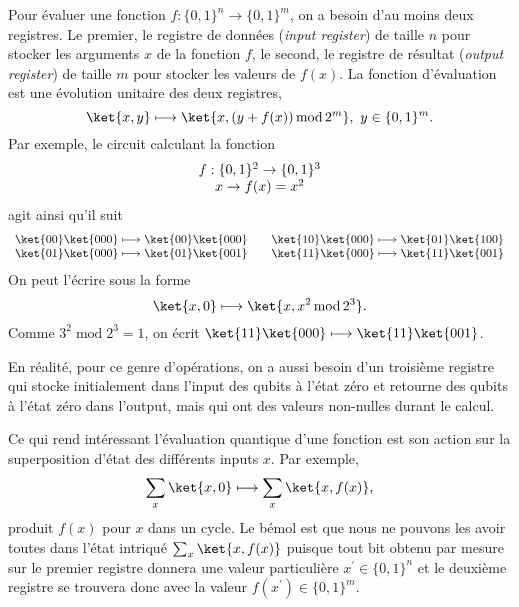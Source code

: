 Pour évaluer une fonction $f:\{0,1\}^n\rightarrow\{0,1\}^{m}$, on a besoin
d'au moins deux registres. Le premier, le registre de données (\emph{input
register}) de taille $n$ pour stocker les arguments $x$ de la fonction $f$, le
second, le registre de résultat (\emph{output register}) de taille $m$ pour
stocker les valeurs de $f(x)$. La fonction d'évaluation est une évolution
unitaire des deux registres,%
\begin{equation}
\ket{x,y} \longmapsto\ket{x,(y+f(x))\operatorname{mod}2^{m}},\ y\in\{0,1\}^{m}.
\end{equation}
Par exemple, le circuit calculant la fonction%
\begin{equation}%
\begin{array}
[c]{c}%
f:\{0,1\}^2\rightarrow\{0,1\}^{3}\\
x\rightarrow f(x)=x^2%
\end{array}
\end{equation}
agit ainsi qu'il suit%
\begin{equation}%
\begin{array}
[c]{ccc}%
\ket{00} \ket{000}\longmapsto\ket{00}\ket{000} &  & \ket{10}
\ket{000}\longmapsto\ket{01}\ket{100}\\
\ket{01} \ket{000}\longmapsto\ket{01}\ket{001} &  & \ket{11}
\ket{000}\longmapsto\ket{11}\ket{001}
\end{array}
\end{equation}
On peut l'écrire sous la forme%
\begin{equation}
\ket{x,0} \longmapsto\ket{x,x^2\operatorname{mod}2^{3}}.
\end{equation}
Comme $3^2\operatorname{mod}2^{3}=1$, on écrit $\ket{11}
\ket{000}\longmapsto\ket{11}\ket{001}$.

En réalité, pour ce genre d'opérations, on a aussi besoin d'un troisième
registre qui stocke initialement dans l'input des qubits à l'état zéro et
retourne des qubits à l'état zéro dans l'output, mais qui ont des valeurs
non-nulles durant le calcul.

Ce qui rend intéressant l'évaluation quantique d'une fonction est son action
sur la superposition d'état des différents inputs $x$. Par exemple,%
\begin{equation}
\sum_{x}\ket{x,0} \longmapsto\sum_{x}\ket{x,f(x)},
\end{equation}
produit $f(x)$ pour $x$ dans un cycle. Le bémol est que nous ne pouvons les
avoir toutes dans l'état intriqué $\sum_{x}\ket{x,f(x)} $ puisque tout bit
obtenu par mesure sur le premier registre donnera une valeur particulière
$x^{\prime}\in\{0,1\}^n$ et le deuxième registre se trouvera donc avec la
valeur $f(x^{\prime})\in\{0,1\}^{m}$.

